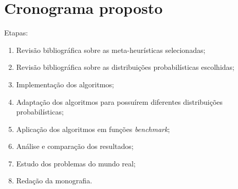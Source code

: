 \documentclass[11pt]{article}
\begin{document}
\section{Cronograma proposto}
\label{cro}

Etapas:

\begin{enumerate}
    \item Revisão bibliográfica sobre as meta-heurísticas selecionadas;
    \item Revisão bibliográfica sobre as distribuições probabilísticas escolhidas;
    \item Implementação dos algoritmos;
    \item Adaptação dos algoritmos para possuírem diferentes distribuições probabilísticas;
    \item Aplicação dos algoritmos em funções \textit{benchmark};
    \item Análise e comparação dos resultados;
    \item Estudo dos problemas do mundo real;
    \item Redação da monografia.
\end{enumerate}
\end{document}
